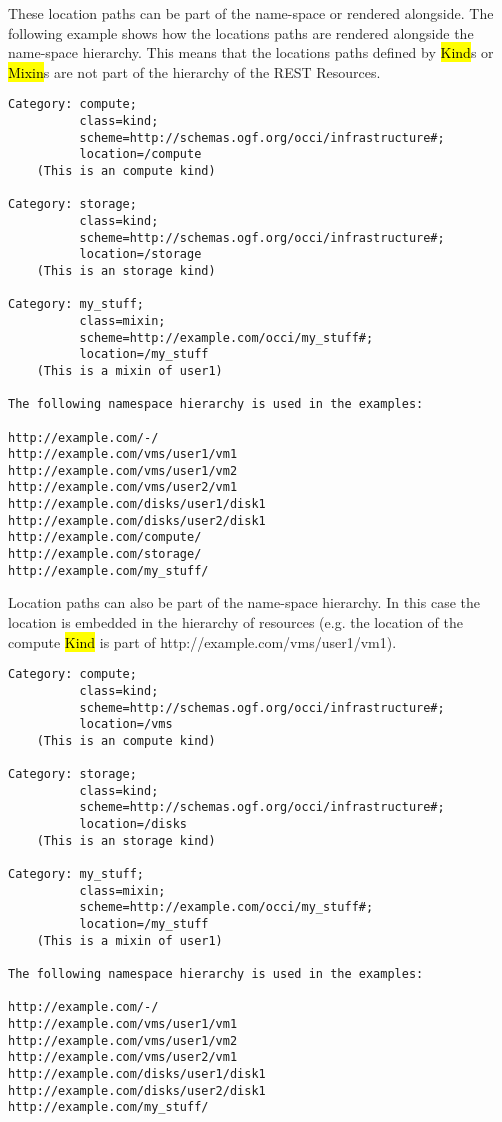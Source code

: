 \documentclass[10pt,a4paper]{article}
\begin{document}
These location paths can be part of the name-space or rendered
alongside. The following example shows how the locations paths are
rendered alongside the name-space hierarchy. This means that the
locations paths defined by \hl{Kind}s or \hl{Mixin}s are not part of
the hierarchy of the REST Resources.

\begin{verbatim}
Category: compute;
          class=kind;
          scheme=http://schemas.ogf.org/occi/infrastructure#;
          location=/compute 
    (This is an compute kind)

Category: storage;
          class=kind;
          scheme=http://schemas.ogf.org/occi/infrastructure#;
          location=/storage 
    (This is an storage kind)

Category: my_stuff;
          class=mixin;
          scheme=http://example.com/occi/my_stuff#;
          location=/my_stuff 
    (This is a mixin of user1)

The following namespace hierarchy is used in the examples:

http://example.com/-/
http://example.com/vms/user1/vm1
http://example.com/vms/user1/vm2
http://example.com/vms/user2/vm1
http://example.com/disks/user1/disk1
http://example.com/disks/user2/disk1
http://example.com/compute/
http://example.com/storage/
http://example.com/my_stuff/
\end{verbatim}

Location paths can also be part of the name-space hierarchy. In this
case the location is embedded in the hierarchy of resources (e.g. the location
of the compute \hl{Kind} is part of
http://example.com/vms/user1/vm1).

\begin{verbatim}
Category: compute;
          class=kind;
          scheme=http://schemas.ogf.org/occi/infrastructure#;
          location=/vms 
    (This is an compute kind)

Category: storage;
          class=kind;
          scheme=http://schemas.ogf.org/occi/infrastructure#;
          location=/disks 
    (This is an storage kind)

Category: my_stuff;
          class=mixin;
          scheme=http://example.com/occi/my_stuff#;
          location=/my_stuff 
    (This is a mixin of user1)

The following namespace hierarchy is used in the examples:

http://example.com/-/
http://example.com/vms/user1/vm1
http://example.com/vms/user1/vm2
http://example.com/vms/user2/vm1
http://example.com/disks/user1/disk1
http://example.com/disks/user2/disk1
http://example.com/my_stuff/
\end{verbatim}
\end{document}
